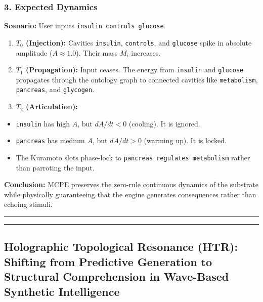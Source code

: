 \documentclass[
  11pt,
  a4paper,
]{article}
\providecommand{\tightlist}{%
  \setlength{\itemsep}{0pt}\setlength{\parskip}{0pt}}
\begin{document}
\subsubsection{3. Expected Dynamics}\label{expected-dynamics}

\textbf{Scenario:} User inputs \texttt{insulin\ controls\ glucose}.

\begin{enumerate}
\def\labelenumi{\arabic{enumi}.}
\tightlist
\item
  \textbf{\(T_0\) (Injection):} Cavities \texttt{insulin},
  \texttt{controls}, and \texttt{glucose} spike in absolute amplitude
  (\(A \approx 1.0\)). Their mass \(M_i\) increases.
\item
  \textbf{\(T_1\) (Propagation):} Input ceases. The energy from
  \texttt{insulin} and \texttt{glucose} propagates through the ontology
  graph to connected cavities like \texttt{metabolism},
  \texttt{pancreas}, and \texttt{glycogen}.
\item
  \textbf{\(T_2\) (Articulation):}
\end{enumerate}

\begin{itemize}
\tightlist
\item
  \texttt{insulin} has high \(A\), but \(dA/dt < 0\) (cooling). It is
  ignored.
\item
  \texttt{pancreas} has medium \(A\), but \(dA/dt > 0\) (warming up). It
  is locked.
\item
  The Kuramoto slots phase-lock to
  \texttt{pancreas\ regulates\ metabolism} rather than parroting the
  input.
\end{itemize}

\textbf{Conclusion:} MCPE preserves the zero-rule continuous dynamics of
the substrate while physically guaranteeing that the engine generates
consequences rather than echoing stimuli.

\begin{center}\rule{0.5\linewidth}{0.5pt}\end{center}

\newpage

\begin{center}\rule{0.5\linewidth}{0.5pt}\end{center}

\subsection{Holographic Topological Resonance (HTR): Shifting from
Predictive Generation to Structural Comprehension in Wave-Based
Synthetic
Intelligence}\label{holographic-topological-resonance-htr-shifting-from-predictive-generation-to-structural-comprehension-in-wave-based-synthetic-intelligence}
\end{document}
